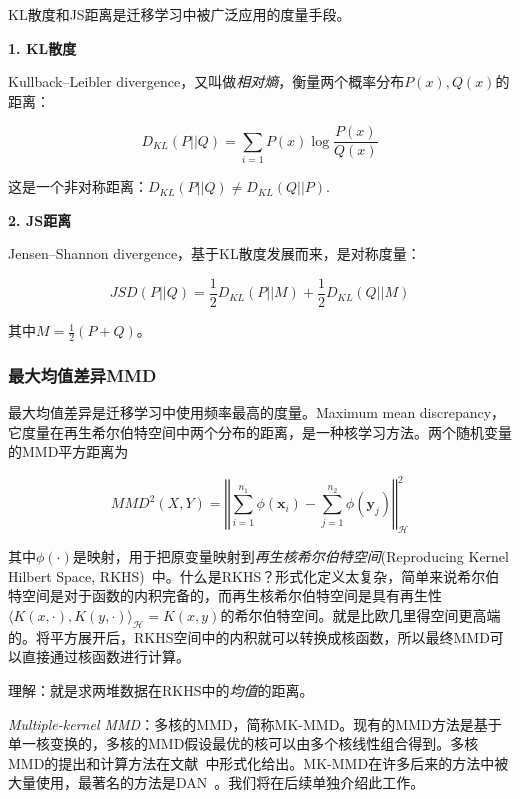 KL散度和JS距离是迁移学习中被广泛应用的度量手段。

\textbf{1. KL散度}

Kullback–Leibler divergence，又叫做\textit{相对熵}，衡量两个概率分布$P(x),Q(x)$的距离：

\begin{equation}
	\label{eq-dist-kl}
	D_{KL}(P||Q)=\sum_{i=1} P(x) \log \frac{P(x)}{Q(x)}
\end{equation}

这是一个非对称距离：$D_{KL}(P||Q) \ne D_{KL}(Q||P)$.

\textbf{2. JS距离}

Jensen–Shannon divergence，基于KL散度发展而来，是对称度量：

\begin{equation}
	\label{eq-dist-js}
	JSD(P||Q)= \frac{1}{2} D_{KL}(P||M) + \frac{1}{2} D_{KL}(Q||M)
\end{equation}

其中$M=\frac{1}{2}(P+Q)$。

\subsubsection{最大均值差异MMD}

最大均值差异是迁移学习中使用频率最高的度量。Maximum mean discrepancy，它度量在再生希尔伯特空间中两个分布的距离，是一种核学习方法。两个随机变量的MMD平方距离为

\begin{equation}
	\label{eq-dist-mmd}
	MMD^2(X,Y)=\left \Vert \sum_{i=1}^{n_1}\phi(\mathbf{x}_i)- \sum_{j=1}^{n_2}\phi(\mathbf{y}_j) \right \Vert^2_\mathcal{H}
\end{equation}

其中$\phi(\cdot)$是映射，用于把原变量映射到\textit{再生核希尔伯特空间}(Reproducing Kernel Hilbert Space, RKHS)~\cite{borgwardt2006integrating}中。什么是RKHS？形式化定义太复杂，简单来说希尔伯特空间是对于函数的内积完备的，而再生核希尔伯特空间是具有再生性$\langle K(x,\cdot),K(y,\cdot)\rangle_\mathcal{H}=K(x,y)$的希尔伯特空间。就是比欧几里得空间更高端的。将平方展开后，RKHS空间中的内积就可以转换成核函数，所以最终MMD可以直接通过核函数进行计算。

理解：就是求两堆数据在RKHS中的\textit{均值}的距离。

\textit{Multiple-kernel MMD}：多核的MMD，简称MK-MMD。现有的MMD方法是基于单一核变换的，多核的MMD假设最优的核可以由多个核线性组合得到。多核MMD的提出和计算方法在文献~\cite{gretton2012optimal}中形式化给出。MK-MMD在许多后来的方法中被大量使用，最著名的方法是DAN~\cite{long2015learning}。我们将在后续单独介绍此工作。

